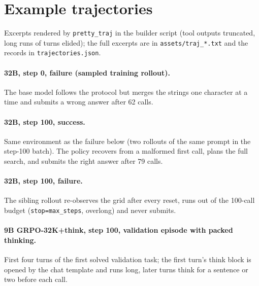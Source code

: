 \documentclass[11pt]{article}
\newcommand{\p}[1]{\texttt{#1}}
\begin{document}
\section{Example trajectories}
Excerpts rendered by \p{pretty\_traj} in the builder script (tool outputs truncated, long runs of turns elided); the full excerpts are in \p{assets/traj\_*.txt} and the records in \p{trajectories.json}.

\paragraph{32B, step 0, failure (sampled training rollout).} The base model follows the protocol but merges the strings one character at a time and submits a wrong answer after 62 calls.


\paragraph{32B, step 100, success.} Same environment as the failure below (two rollouts of the same prompt in the step-100 batch). The policy recovers from a malformed first call, plans the full search, and submits the right answer after 79 calls.


\paragraph{32B, step 100, failure.} The sibling rollout re-observes the grid after every reset, runs out of the 100-call budget (\p{stop=max\_steps}, overlong) and never submits.


\paragraph{9B GRPO-32K+think, step 100, validation episode with packed thinking.} First four turns of the first solved validation task; the first turn's think block is opened by the chat template and runs long, later turns think for a sentence or two before each call.

\end{document}
